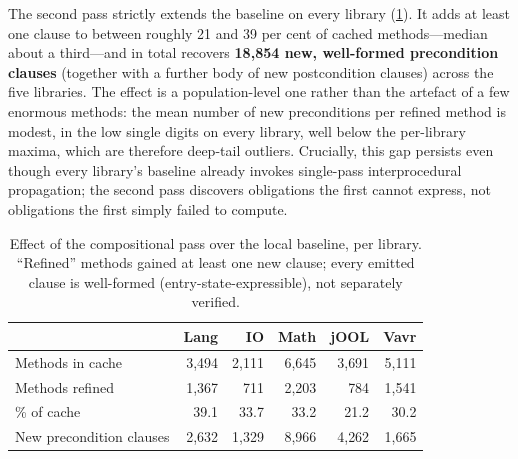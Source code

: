 The second pass strictly extends the baseline on every library
(\cref{tab:comp-headline}). It adds at least one clause to between roughly 21 and
39 per cent of cached methods---median about a third---and in total recovers
\textbf{18{,}854 new, well-formed precondition clauses} (together with a further
body of new postcondition clauses) across the five libraries. The effect is a
population-level one rather than the artefact of a few enormous methods: the mean
number of new preconditions per refined method is modest, in the low single
digits on every library, well below the per-library maxima, which are therefore
deep-tail outliers. Crucially, this gap persists even though every library's
baseline already invokes single-pass interprocedural propagation; the second pass
discovers obligations the first cannot express, not obligations the first simply
failed to compute.

\begin{table}[t]
\centering
\small
\caption{Effect of the compositional pass over the local baseline, per library.
``Refined'' methods gained at least one new clause; every emitted clause is
well-formed (entry-state-expressible), not separately verified.}
\label{tab:comp-headline}
\begin{tabular}{lrrrrr}
\toprule
& \textbf{Lang} & \textbf{IO} & \textbf{Math} & \textbf{jOOL} & \textbf{Vavr} \\
\midrule
Methods in cache        & 3{,}494 & 2{,}111 & 6{,}645 & 3{,}691 & 5{,}111 \\
Methods refined         & 1{,}367 & 711     & 2{,}203 & 784     & 1{,}541 \\
\hspace{1em}\% of cache & 39.1    & 33.7    & 33.2    & 21.2    & 30.2 \\
New precondition clauses & 2{,}632 & 1{,}329 & 8{,}966 & 4{,}262 & 1{,}665 \\
\bottomrule
\end{tabular}
\end{table}


